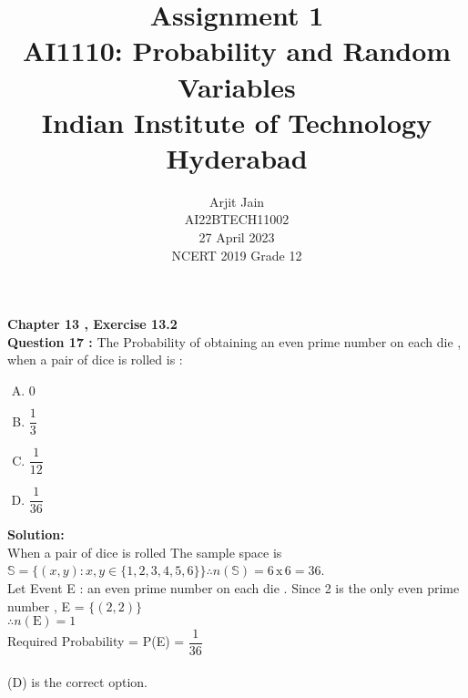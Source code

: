 \documentclass[journal,12pt,twocolumn]{IEEEtran}
\title{Assignment 1 \\ \Large AI1110: Probability and Random Variables \\ \large Indian Institute of Technology Hyderabad}
\author{Arjit Jain \\ \normalsize AI22BTECH11002 \\ \vspace*{20pt} \normalsize  27 April 2023 \\ \vspace*{20pt} \Large NCERT 2019 Grade 12}
\begin{document}
\maketitle

\large

\textbf{Chapter 13 , Exercise 13.2 }\\[6pt]
\textbf{Question 17 :}
The Probability of obtaining an even prime number on each die , when a pair of dice is rolled is :\\
\begin{enumerate}[(A)]
    \item $0$ \vspace{0.5cm}
    \item $\dfrac{1}{3}$ \vspace{0.5cm}
    \item $\dfrac{1}{12}$  \vspace{0.5cm}
    \item $\dfrac{1}{36}$
\end{enumerate}

\vspace{1cm}

\textbf{Solution:} \\[6pt]
When a pair of dice is rolled The sample space is $\mathbb{S}=\{(x,y) : x,y \in \{ 1,2,3,4,5,6\}\} \therefore n(\mathbb{S})=6 \,\text{x}\, 6 = 36$.\\
Let Event E : an even prime number on each die .  Since 2 is the only even prime number , E = $\{(2,2)\}$ \\
$\therefore n(\text{E})=1$\\
Required Probability = P(E) = $\dfrac{1}{36}$\\
\\
(D) is the correct option.
\end{document}
